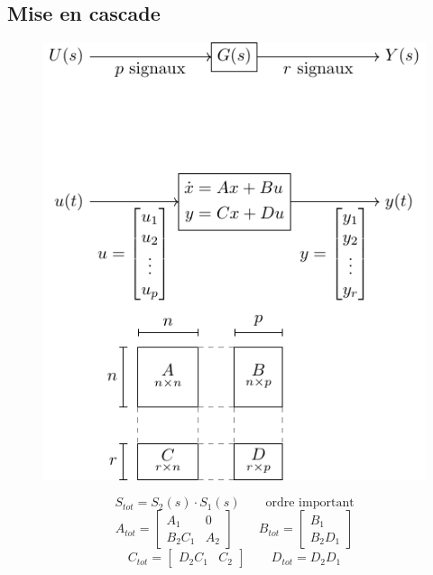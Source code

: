 \documentclass[resume]{subfiles}
\begin{document}
\subsection{Mise en cascade}
\begin{figure}[H]
\centering
\includegraphics[scale=1,page=2]{drwg_0.pdf}
\end{figure}
$$S_{tot}=S_2(s)\cdot S_1(s)\qquad\text{ordre important}$$
$$A_{tot}=\begin{bmatrix}
A_1 & 0\\
B_2C_1 & A_2
\end{bmatrix}\qquad B_{tot}=\begin{bmatrix}
B_1\\B_2D_1
\end{bmatrix}$$
$$C_{tot}=\begin{bmatrix}
D_2C_1 & C_2
\end{bmatrix}\qquad D_{tot}=D_2D_1$$
\end{document}
